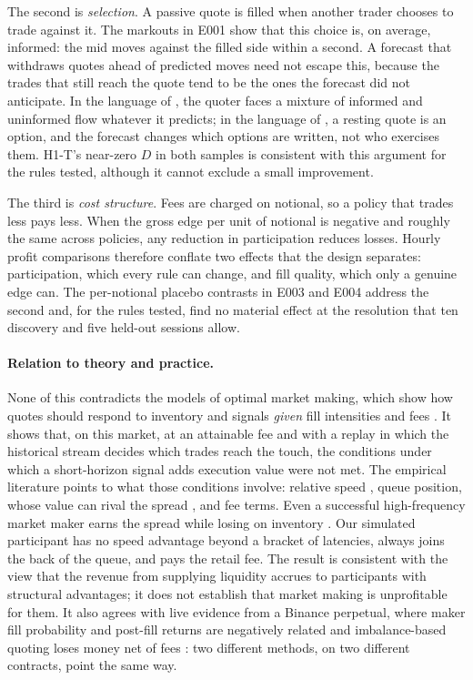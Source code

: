 \documentclass[11pt]{article}
\begin{document}
The second is \emph{selection}. A passive quote is filled when another trader chooses to trade against it. The markouts in
E001 show that this choice is, on average, informed: the mid moves against the filled side within a second. A forecast
that withdraws quotes ahead of predicted moves need not escape this, because the trades that still reach the quote tend to
be the ones the forecast did not anticipate. In the language of \citet{glosten1985}, the quoter faces a mixture of informed
and uninformed flow whatever it predicts; in the language of \citet{copeland1983}, a resting quote is an option, and the
forecast changes which options are written, not who exercises them. H1-T's near-zero $D$ in both samples is consistent with this argument for
the rules tested, although it cannot exclude a small improvement.

The third is \emph{cost structure}. Fees are charged on notional, so a policy that trades less pays less. When the gross
edge per unit of notional is negative and roughly the same across policies, any reduction in participation reduces
losses. Hourly profit comparisons therefore conflate two effects that the design separates: participation, which every
rule can change, and fill quality, which only a genuine edge can. The per-notional placebo contrasts in E003 and E004
address the second and, for the rules tested, find no material effect at the resolution that ten discovery and five
held-out sessions allow.

\paragraph{Relation to theory and practice.} None of this contradicts the models of optimal market making, which show
how quotes should respond to inventory and signals \emph{given} fill intensities and fees
\citep{avellaneda2008,gueant2013,cartea2018}. It shows that, on this market, at an attainable fee and with a replay in
which the historical stream decides which trades reach the touch, the conditions under which a short-horizon signal adds execution value were not met.
The empirical literature points to what those conditions involve: relative speed \citep{baron2019}, queue position, whose
value can rival the spread \citep{moallemi2017}, and fee terms. Even a successful high-frequency market maker earns the
spread while losing on inventory \citep{menkveld2013}. Our simulated participant has no speed advantage beyond a bracket of
latencies, always joins the back of the queue, and pays the retail fee. The result is consistent with the view that the
revenue from supplying liquidity accrues to participants with structural advantages; it does not establish that market
making is unprofitable for them. It also agrees with live evidence from a Binance perpetual, where maker fill probability
and post-fill returns are negatively related and imbalance-based quoting loses money net of fees
\citep{albers2025dilemma}: two different methods, on two different contracts, point the same way.
\end{document}
